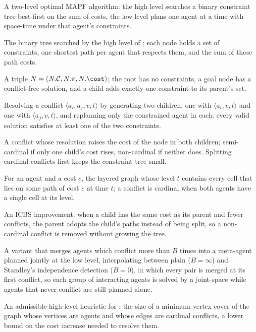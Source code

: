 \item[Conflict-based search (CBS)] A two-level optimal MAPF algorithm: the high level searches a binary constraint tree best-first on the sum of costs, the low level plans one agent at a time with space-time \astar under that agent's constraints.
\item[Constraint tree (CT)] The binary tree searched by the high level of \cbs; each node holds a set of constraints, one shortest path per agent that respects them, and the sum of those path costs.
\item[CT node] A triple $N = (N.\mathcal{C}, N.\pi, N.\cost)$; the root has no constraints, a goal node has a conflict-free solution, and a child adds exactly one constraint to its parent's set.
\item[Conflict splitting] Resolving a conflict $\langle a_i, a_j, v, t\rangle$ by generating two children, one with $\langle a_i, v, t\rangle$ and one with $\langle a_j, v, t\rangle$, and replanning only the constrained agent in each; every valid solution satisfies at least one of the two constraints.
\item[Cardinal conflict] A conflict whose resolution raises the cost of the node in both children; semi-cardinal if only one child's cost rises, non-cardinal if neither does. Splitting cardinal conflicts first keeps the constraint tree small.
\item[Multi-valued decision diagram (MDD)] For an agent and a cost $c$, the layered graph whose level $t$ contains every cell that lies on some path of cost $c$ at time $t$; a conflict is cardinal when both agents have a single cell at its level.
\item[Bypass] An ICBS improvement: when a child has the same cost as its parent and fewer conflicts, the parent adopts the child's paths instead of being split, so a non-cardinal conflict is removed without growing the tree.
\item[Meta-agent CBS (MA-CBS)] A variant that merges agents which conflict more than $B$ times into a meta-agent planned jointly at the low level, interpolating between plain \cbs ($B = \infty$) and Standley's independence detection ($B = 0$), in which every pair is merged at its first conflict, so each group of interacting agents is solved by a joint-space \astar while agents that never conflict are still planned alone.
\item[Conflict-graph heuristic (CG)] An admissible high-level heuristic for \cbs: the size of a minimum vertex cover of the graph whose vertices are agents and whose edges are cardinal conflicts, a lower bound on the cost increase needed to resolve them.
